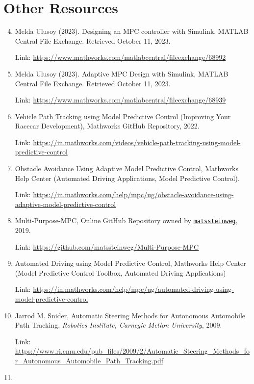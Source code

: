 \section{Other Resources}
\begin{enumerate}
    \setcounter{enumi}{3}
    \item Melda Ulusoy (2023). Designing an MPC controller with Simulink, MATLAB Central File Exchange. Retrieved October 11, 2023.

    Link: \href{https://www.mathworks.com/matlabcentral/fileexchange/68992-designing-an-mpc-controller-with-simulink}{https://www.mathworks.com/matlabcentral/fileexchange/68992}

    \item Melda Ulusoy (2023). Adaptive MPC Design with Simulink, MATLAB Central File Exchange. Retrieved October 11, 2023.

    Link: \href{https://www.mathworks.com/matlabcentral/fileexchange/68939-adaptive-mpc-design-with-simulink}{https://www.mathworks.com/matlabcentral/fileexchange/68939}
    \item Vehicle Path Tracking using Model Predictive Control (Improving Your Racecar Development), Mathworks GitHub Repository, 2022.

    Link: \href{https://in.mathworks.com/videos/vehicle-path-tracking-using-model-predictive-control-1647494222398.html}{https://in.mathworks.com/videos/vehicle-path-tracking-using-model-predictive-control}
    \newpage
    \item Obstacle Avoidance Using Adaptive Model Predictive Control, Mathworks Help Center (Automated Driving Applications, Model Predictive Control).

    Link: \href{https://in.mathworks.com/help/mpc/ug/obstacle-avoidance-using-adaptive-model-predictive-control.html}{https://in.mathworks.com/help/mpc/ug/obstacle-avoidance-using-adaptive-model-predictive-control}
    \item Multi-Purpose-MPC, Online GitHub Repository owned by \href{https://github.com/matssteinweg}{\texttt{matssteinweg}}, 2019.

    Link:
    \href{https://github.com/matssteinweg/Multi-Purpose-MPC}{https://github.com/matssteinweg/Multi-Purpose-MPC}
    \item Automated Driving using Model Predictive Control, Mathworks Help Center (Model Predictive Control Toolbox, Automated Driving Applications)

    Link: \href{https://in.mathworks.com/help/mpc/ug/automated-driving-using-model-predictive-control.html}{https://in.mathworks.com/help/mpc/ug/automated-driving-using-model-predictive-control}
    \item Jarrod M. Snider, Automatic Steering Methods for Autonomous Automobile Path Tracking, \textit{Robotics Institute, Carnegie Mellon University}, 2009.

    Link: \href{https://www.ri.cmu.edu/pub_files/2009/2/Automatic_Steering_Methods_for_Autonomous_Automobile_Path_Tracking.pdf}{https://www.ri.cmu.edu/pub\_files/2009/2/Automatic\_Steering\_Methods\_for\_Autonomous\_Automobile\newline\_Path\_Tracking.pdf}
    \item 
\end{enumerate}